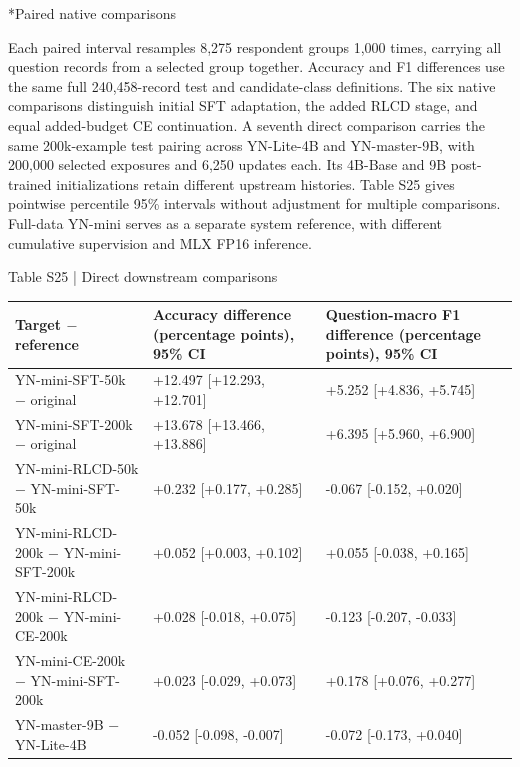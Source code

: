 \documentclass[10pt]{article}
\makeatletter
\renewcommand\subsection{\@startsection{subsection}{2}{\z@}{-1.7ex plus -.5ex minus -.2ex}{.6ex plus .2ex}{\normalfont\normalsize\mdseries}}
\makeatother
\begin{document}
\subsection*{Paired native comparisons}

Each paired interval resamples 8,275 respondent groups 1,000 times, carrying all question records from a selected group together. Accuracy and F1 differences use the same full 240,458-record test and candidate-class definitions. The six native comparisons distinguish initial SFT adaptation, the added RLCD stage, and equal added-budget CE continuation. A seventh direct comparison carries the same 200k-example test pairing across YN-Lite-4B and YN-master-9B, with 200,000 selected exposures and 6,250 updates each. Its 4B-Base and 9B post-trained initializations retain different upstream histories. Table S25 gives pointwise percentile 95\% intervals without adjustment for multiple comparisons. Full-data YN-mini serves as a separate system reference, with different cumulative supervision and MLX FP16 inference.

\begin{center}\begin{minipage}{\textwidth}\fontsize{8.5}{10.3}\selectfont
{}\label{tab:paired-training}Table S25 | Direct downstream comparisons
\par\vspace{4pt}
\begin{tabularx}{\textwidth}{@{}XXX@{}}\toprule
Target $-$ reference & Accuracy difference (percentage points), 95\% CI & Question-macro F1 difference (percentage points), 95\% CI \\
\midrule
YN-mini-SFT-50k $-$ original & +12.497 [+12.293, +12.701] & +5.252 [+4.836, +5.745] \\
YN-mini-SFT-200k $-$ original & +13.678 [+13.466, +13.886] & +6.395 [+5.960, +6.900] \\
YN-mini-RLCD-50k $-$ YN-mini-SFT-50k & +0.232 [+0.177, +0.285] & -0.067 [-0.152, +0.020] \\
YN-mini-RLCD-200k $-$ YN-mini-SFT-200k & +0.052 [+0.003, +0.102] & +0.055 [-0.038, +0.165] \\
YN-mini-RLCD-200k $-$ YN-mini-CE-200k & +0.028 [-0.018, +0.075] & -0.123 [-0.207, -0.033] \\
YN-mini-CE-200k $-$ YN-mini-SFT-200k & +0.023 [-0.029, +0.073] & +0.178 [+0.076, +0.277] \\
YN-master-9B $-$ YN-Lite-4B & -0.052 [-0.098, -0.007] & -0.072 [-0.173, +0.040] \\
\bottomrule\end{tabularx}
\end{minipage}\end{center}
\end{document}
